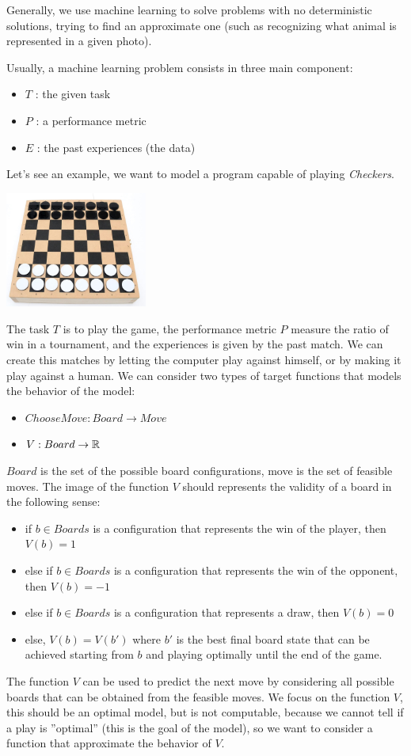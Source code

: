 \documentclass[10pt, letterpaper]{report}
\begin{document}
Generally, we use machine learning to solve problems with no deterministic solutions, trying to find an approximate one (such as recognizing what animal is represented in a given photo).\bigskip

Usually, a machine learning problem consists in three main component:\begin{itemize}
	\item $T$ : the given task
	\item $P$ : a performance metric
	\item $E$ : the past experiences (the data)
\end{itemize}
Let's see an example, we want to model a program capable of playing \textit{Checkers}.
\begin{center}
	\includegraphics[width=0.35\textwidth]{images/Checkers.jpg}
\end{center}
The task $T$ is to play the game, the performance metric $P$ measure the ratio of win in a tournament, and the experiences is given by the past match. We can create this matches by letting the computer play against himself, or by making it play against a human. We can consider two types of target functions that models the behavior of the model:\begin{itemize}
	\item $ChooseMove : Board\rightarrow Move$
	\item $V : Board\rightarrow{\mathbb R}$
\end{itemize}
$Board$ is the set of the possible board configurations, move is the set of feasible moves. The image of the function $V$ should represents the validity of a board in the following sense:\begin{itemize}
	\item if $b\in Boards$ is a configuration that represents the win of the player, then $V(b)=1$
	\item else if $b\in Boards$ is a configuration that represents the win of the opponent, then $V(b)=-1$
	\item else if $b\in Boards$ is a configuration that represents a draw, then $V(b)=0$
	\item else, $V(b)=V(b')$ where $b'$ is
	      the best final board state that can be achieved starting from $b$ and
	      playing optimally until the end of the game.
\end{itemize}
The function $V$ can be used to predict the next move by considering all possible boards that can be obtained from the feasible moves.
We focus on the function $V$, this should be an optimal model, but is not computable, because we cannot tell if a play is ''optimal'' (this is the goal of the model), so we want to consider a function that approximate the behavior of $V$.\bigskip
\end{document}
